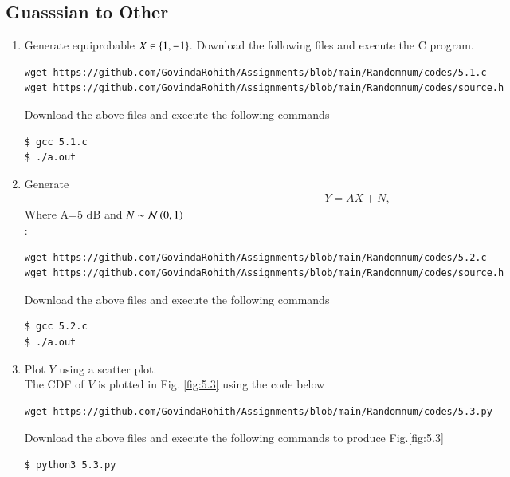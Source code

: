 \documentclass[journal,12pt,twocolumn]{IEEEtran}
\renewcommand\thesection{\arabic{section}}
\begin{document}
\begin{enumerate}[label=\thesection.\arabic*
,ref=\thesection.\theenumi]
\section{Guasssian to Other}
\begin{enumerate}[label=\thesection.\arabic*
,ref=\thesection.\theenumi]
\item Generate equiprobable $X \in \left\{1,-1\right\}$.
\solution Download the following files and execute the  C program.
\begin{lstlisting}
wget https://github.com/GovindaRohith/Assignments/blob/main/Randomnum/codes/5.1.c
wget https://github.com/GovindaRohith/Assignments/blob/main/Randomnum/codes/source.h
\end{lstlisting}
Download the above files and execute the following commands
\begin{lstlisting}
$ gcc 5.1.c
$ ./a.out
\end{lstlisting}
\item Generate
\begin{align}
    Y=AX+N,
\end{align}
Where A=5 dB and $N\sim \mathcal{N}\left(0,1\right)$\\
\solution:
\begin{lstlisting}
wget https://github.com/GovindaRohith/Assignments/blob/main/Randomnum/codes/5.2.c
wget https://github.com/GovindaRohith/Assignments/blob/main/Randomnum/codes/source.h
\end{lstlisting}
Download the above files and execute the following commands
\begin{lstlisting}
$ gcc 5.2.c
$ ./a.out
\end{lstlisting}
	\item Plot $Y$ using a scatter plot.\\
	\solution
	The CDF of $V$ is plotted in Fig. \ref{fig:5.3} using the code below
\begin{lstlisting}
wget https://github.com/GovindaRohith/Assignments/blob/main/Randomnum/codes/5.3.py
\end{lstlisting}
Download the above files and execute the following commands to produce Fig.\ref{fig:5.3}
\begin{lstlisting}
$ python3 5.3.py
\end{lstlisting}
\begin{figure}[!h]
\centering

\end{figure}
\end{enumerate}
\end{enumerate}
\end{document}
